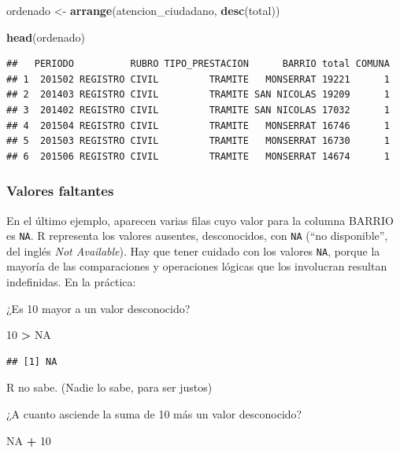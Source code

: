 \documentclass[]{book}
\newenvironment{Shaded}{\begin{snugshade}}{\end{snugshade}}
\newcommand{\KeywordTok}[1]{\textcolor[rgb]{0.13,0.29,0.53}{\textbf{#1}}}
\newcommand{\DecValTok}[1]{\textcolor[rgb]{0.00,0.00,0.81}{#1}}
\newcommand{\StringTok}[1]{\textcolor[rgb]{0.31,0.60,0.02}{#1}}
\newcommand{\OtherTok}[1]{\textcolor[rgb]{0.56,0.35,0.01}{#1}}
\newcommand{\OperatorTok}[1]{\textcolor[rgb]{0.81,0.36,0.00}{\textbf{#1}}}
\newcommand{\NormalTok}[1]{#1}
\begin{document}
\begin{Shaded}
\begin{Highlighting}[]
\NormalTok{ordenado <-}\StringTok{ }\KeywordTok{arrange}\NormalTok{(atencion_ciudadano, }\KeywordTok{desc}\NormalTok{(total))}

\KeywordTok{head}\NormalTok{(ordenado)}
\end{Highlighting}
\end{Shaded}

\begin{verbatim}
##   PERIODO          RUBRO TIPO_PRESTACION      BARRIO total COMUNA
## 1  201502 REGISTRO CIVIL         TRAMITE   MONSERRAT 19221      1
## 2  201403 REGISTRO CIVIL         TRAMITE SAN NICOLAS 19209      1
## 3  201402 REGISTRO CIVIL         TRAMITE SAN NICOLAS 17032      1
## 4  201504 REGISTRO CIVIL         TRAMITE   MONSERRAT 16746      1
## 5  201503 REGISTRO CIVIL         TRAMITE   MONSERRAT 16730      1
## 6  201506 REGISTRO CIVIL         TRAMITE   MONSERRAT 14674      1
\end{verbatim}

\subsubsection{Valores faltantes}\label{valores-faltantes}

En el último ejemplo, aparecen varias filas cuyo valor para la columna
BARRIO es \texttt{NA}. R representa los valores ausentes, desconocidos,
con \texttt{NA} (``no disponible'', del inglés \emph{Not Available}).
Hay que tener cuidado con los valores \texttt{NA}, porque la mayoría de
las comparaciones y operaciones lógicas que los involucran resultan
indefinidas. En la práctica:

¿Es 10 mayor a un valor desconocido?

\begin{Shaded}
\begin{Highlighting}[]
\DecValTok{10} \OperatorTok{>}\StringTok{ }\OtherTok{NA}
\end{Highlighting}
\end{Shaded}

\begin{verbatim}
## [1] NA
\end{verbatim}

R no sabe. (Nadie lo sabe, para ser justos)

¿A cuanto asciende la suma de 10 más un valor desconocido?

\begin{Shaded}
\begin{Highlighting}[]
\OtherTok{NA} \OperatorTok{+}\StringTok{ }\DecValTok{10}
\end{Highlighting}
\end{Shaded}
\end{document}

